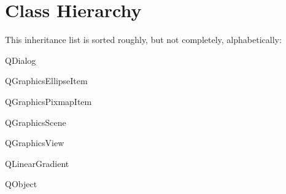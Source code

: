 \section{Class Hierarchy}
This inheritance list is sorted roughly, but not completely, alphabetically\-:\begin{DoxyCompactList}
\item {}
\item {}
\item {}
\item Q\-Dialog\begin{DoxyCompactList}
\item {}
\end{DoxyCompactList}
\item Q\-Graphics\-Ellipse\-Item\begin{DoxyCompactList}
\item {}
\end{DoxyCompactList}
\item Q\-Graphics\-Pixmap\-Item\begin{DoxyCompactList}
\item {}
\end{DoxyCompactList}
\item Q\-Graphics\-Scene\begin{DoxyCompactList}
\item {}
\end{DoxyCompactList}
\item Q\-Graphics\-View\begin{DoxyCompactList}
\item {}
\end{DoxyCompactList}
\item Q\-Linear\-Gradient\begin{DoxyCompactList}
\item {}
\end{DoxyCompactList}
\item Q\-Object\begin{DoxyCompactList}

\end{DoxyCompactList}
\end{DoxyCompactList}
